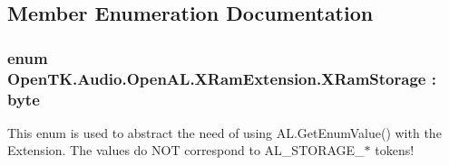 \subsection{Member Enumeration Documentation}
\hypertarget{class_open_t_k_1_1_audio_1_1_open_a_l_1_1_x_ram_extension_a3803535777a75c990d24d61ac1acfd3f}{
\subsubsection[{X\-Ram\-Storage}]{\setlength{\rightskip}{0pt plus 5cm}enum {\bf Open\-T\-K.\-Audio.\-Open\-A\-L.\-X\-Ram\-Extension.\-X\-Ram\-Storage} \-: byte}}\label{class_open_t_k_1_1_audio_1_1_open_a_l_1_1_x_ram_extension_a3803535777a75c990d24d61ac1acfd3f}


This enum is used to abstract the need of using A\-L.\-Get\-Enum\-Value() with the Extension. The values do N\-O\-T correspond to A\-L\-\_\-\-S\-T\-O\-R\-A\-G\-E\-\_\-$\ast$ tokens!

